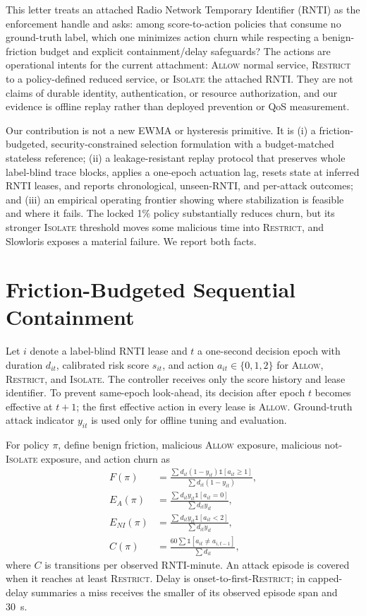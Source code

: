 \documentclass[journal,10pt]{IEEEtran}
\newcommand{\Allow}{\textsc{Allow}}
\newcommand{\Restrict}{\textsc{Restrict}}
\newcommand{\Isolate}{\textsc{Isolate}}
\begin{document}
This letter treats an attached Radio Network Temporary Identifier (RNTI) as the enforcement handle and asks: among score-to-action policies that consume no ground-truth label, which one minimizes action churn while respecting a benign-friction budget and explicit containment/delay safeguards? The actions are operational intents for the current attachment: \Allow{} normal service, \Restrict{} to a policy-defined reduced service, or \Isolate{} the attached RNTI. They are not claims of durable identity, authentication, or resource authorization, and our evidence is offline replay rather than deployed prevention or QoS measurement.

Our contribution is not a new EWMA or hysteresis primitive. It is (i) a friction-budgeted, security-constrained selection formulation with a budget-matched stateless reference; (ii) a leakage-resistant replay protocol that preserves whole label-blind trace blocks, applies a one-epoch actuation lag, resets state at inferred RNTI leases, and reports chronological, unseen-RNTI, and per-attack outcomes; and (iii) an empirical operating frontier showing where stabilization is feasible and where it fails. The locked 1\% policy substantially reduces churn, but its stronger \Isolate{} threshold moves some malicious time into \Restrict{}, and Slowloris exposes a material failure. We report both facts.

\section{Friction-Budgeted Sequential Containment}
Let $i$ denote a label-blind RNTI lease and $t$ a one-second decision epoch with duration $d_{it}$, calibrated risk score $s_{it}$, and action $a_{it}\in\{0,1,2\}$ for \Allow{}, \Restrict{}, and \Isolate{}. The controller receives only the score history and lease identifier. To prevent same-epoch look-ahead, its decision after epoch $t$ becomes effective at $t+1$; the first effective action in every lease is \Allow{}. Ground-truth attack indicator $y_{it}$ is used only for offline tuning and evaluation.

For policy $\pi$, define benign friction, malicious \Allow{} exposure, malicious not-\Isolate{} exposure, and action churn as
\begin{align}
F(\pi)&=\frac{\sum d_{it}(1-y_{it})\mathbb{1}[a_{it}\geq1]}
 {\sum d_{it}(1-y_{it})},\label{eq:f}\\
E_A(\pi)&=\frac{\sum d_{it}y_{it}\mathbb{1}[a_{it}=0]}
 {\sum d_{it}y_{it}},\label{eq:ea}\\
E_{NI}(\pi)&=\frac{\sum d_{it}y_{it}\mathbb{1}[a_{it}<2]}
 {\sum d_{it}y_{it}},\label{eq:eni}\\
C(\pi)&=\frac{60\sum\mathbb{1}[a_{it}\ne a_{i,t-1}]}{\sum d_{it}},
\label{eq:c}
\end{align}
where $C$ is transitions per observed RNTI-minute. An attack episode is covered when it reaches at least \Restrict{}. Delay is onset-to-first-\Restrict{}; in capped-delay summaries a miss receives the smaller of its observed episode span and 30~s.
\end{document}
